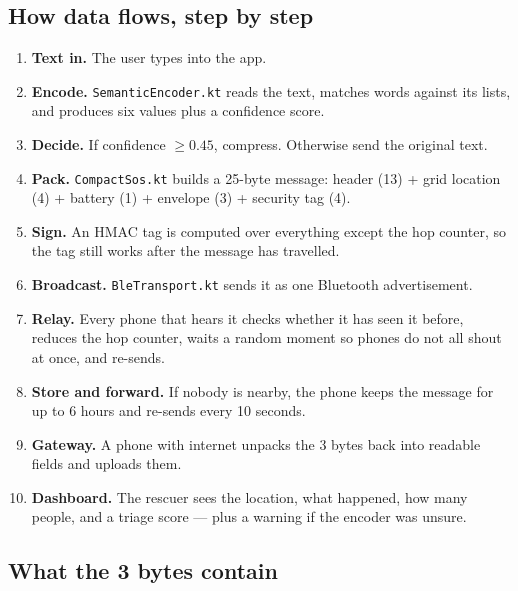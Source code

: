 \documentclass[11pt,a4paper]{article}
\begin{document}
\subsection{How data flows, step by step}

\begin{enumerate}
\item \textbf{Text in.} The user types into the app.
\item \textbf{Encode.} \texttt{SemanticEncoder.kt} reads the text, matches
      words against its lists, and produces six values plus a confidence score.
\item \textbf{Decide.} If confidence $\geq 0.45$, compress. Otherwise send the
      original text.
\item \textbf{Pack.} \texttt{CompactSos.kt} builds a 25-byte message: header
      (13) + grid location (4) + battery (1) + envelope (3) + security tag (4).
\item \textbf{Sign.} An HMAC tag is computed over everything except the hop
      counter, so the tag still works after the message has travelled.
\item \textbf{Broadcast.} \texttt{BleTransport.kt} sends it as one Bluetooth
      advertisement.
\item \textbf{Relay.} Every phone that hears it checks whether it has seen it
      before, reduces the hop counter, waits a random moment so phones do not
      all shout at once, and re-sends.
\item \textbf{Store and forward.} If nobody is nearby, the phone keeps the
      message for up to 6 hours and re-sends every 10 seconds.
\item \textbf{Gateway.} A phone with internet unpacks the 3 bytes back into
      readable fields and uploads them.
\item \textbf{Dashboard.} The rescuer sees the location, what happened, how
      many people, and a triage score --- plus a warning if the encoder was
      unsure.
\end{enumerate}

\subsection{What the 3 bytes contain}
\end{document}
